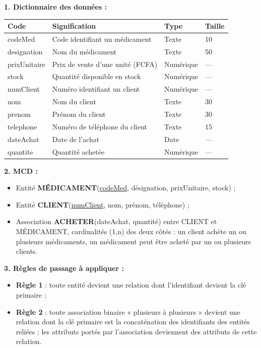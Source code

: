 \documentclass[11pt]{article}
\begin{document}
\begin{corrige}
\textbf{1. Dictionnaire des données :}
\begin{center}
\begin{tabularx}{\linewidth}{|l|X|l|l|}\hline
\rowcolor{popblueL}\textbf{Code} & \textbf{Signification} & \textbf{Type} & \textbf{Taille} \\\hline
codeMed & Code identifiant un médicament & Texte & 10 \\\hline
designation & Nom du médicament & Texte & 50 \\\hline
prixUnitaire & Prix de vente d'une unité (FCFA) & Numérique & --- \\\hline
stock & Quantité disponible en stock & Numérique & --- \\\hline
numClient & Numéro identifiant un client & Numérique & --- \\\hline
nom & Nom du client & Texte & 30 \\\hline
prenom & Prénom du client & Texte & 30 \\\hline
telephone & Numéro de téléphone du client & Texte & 15 \\\hline
dateAchat & Date de l'achat & Date & --- \\\hline
quantite & Quantité achetée & Numérique & --- \\\hline
\end{tabularx}
\end{center}

\textbf{2. MCD :}
\begin{itemize}
  \item Entité \textbf{MÉDICAMENT}(\underline{codeMed}, désignation, prixUnitaire, stock) ;
  \item Entité \textbf{CLIENT}(\underline{numClient}, nom, prénom, téléphone) ;
  \item Association \textbf{ACHETER}(dateAchat, quantité) entre CLIENT et MÉDICAMENT, cardinalités (1,n) des deux côtés : un client achète un ou plusieurs médicaments, un médicament peut être acheté par un ou plusieurs clients.
\end{itemize}

\textbf{3. Règles de passage à appliquer :}
\begin{itemize}
  \item \textbf{Règle 1} : toute entité devient une relation dont l'identifiant devient la clé primaire ;
  \item \textbf{Règle 2} : toute association binaire « plusieurs à plusieurs » devient une relation dont la clé primaire est la concaténation des identifiants des entités reliées ; les attributs portés par l'association deviennent des attributs de cette relation.
\end{itemize}


\end{corrige}
\end{document}
